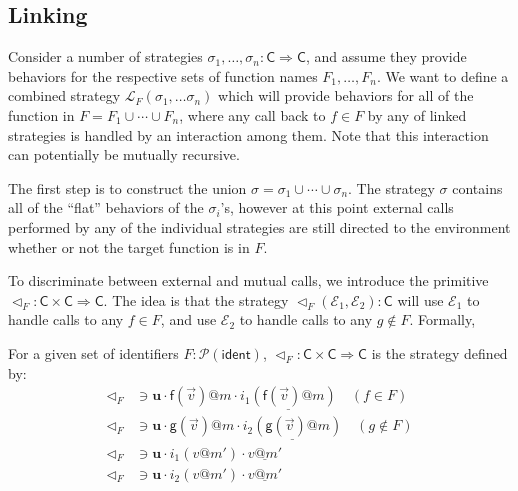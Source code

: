 \documentclass[acmsmall,anonymous]{acmart}
\makeatletter
\newcommand{\kw}[1]{\ensuremath{ \textsf{#1} }}
\newcommand{\EC}{\kw{C}}
\newcommand{\mcall}[3]{\kw{#1}({#2})@{#3}}
\newcommand{\pcall}[3]{%
  \underline{\mcall{#1}{#2}{#3}}%
}
\newcommand{\mret}[2]{{#1}@{#2}}
\newcommand{\pret}[2]{%
  \underline{\mret{#1}{#2}}%
}
\newcommand{\pshift}{1.6ex}
\newcommand{\pcdist}{2.5}
\newcommand{\pcangle}{60}
\newcommand{\ph}[1]{%
  \tikz[remember picture]{\coordinate (#1);}}
\newcommand{\pt}[1]{%
  \tikz[remember picture, overlay]{
    \draw[->]
      let \p{dest} = (#1),
          \n1 = {ln(veclen(\x{dest}, \y{dest}) + 1)},
          \p1 = ($(0,0)+(0,\pshift)$),
          \p4 = ($(#1)+(0,\pshift)$),
          \p2 = ($(\p1)!\n1*\pcdist!-\pcangle:(\p4)$),
          \p3 = ($(\p4)!\n1*\pcdist!+\pcangle:(\p1)$) in
        (\p1) .. controls (\p2) and (\p3) .. (\p4);}}
\makeatother
\begin{document}


\subsection{Linking} %

Consider a number of strategies
$\sigma_1, \ldots, \sigma_n : \EC \Rightarrow \EC$,
and assume they provide behaviors
for the respective sets of function names $F_1, \ldots, F_n$.
We want to define
a combined strategy $\mathcal{L}_F(\sigma_1, \ldots \sigma_n)$
which will provide behaviors for
all of the function in $F = F_1 \cup \cdots \cup F_n$,
where any call back to $f \in F$ by any of linked strategies
is handled by an interaction among them.
Note that this interaction
can potentially be mutually recursive.

The first step is to construct the union
$\sigma = \sigma_1 \cup \cdots \cup \sigma_n$.
The strategy $\sigma$
contains all of the ``flat'' behaviors of the $\sigma_i$'s,
however at this point
external calls performed by any of the individual strategies
are still directed to the environment
whether or not the target function is in $F$.

To discriminate between external and mutual calls,
we introduce the primitive $\lhd_F : \EC \times \EC \Rightarrow \EC$.
The idea is that the strategy $\lhd_F(\mathcal{E}_1, \mathcal{E}_2) : \EC$
will use $\mathcal{E}_1$ to handle calls to any $f \in F$,
and use $\mathcal{E}_2$ to handle calls to any $g \notin F$.
Formally,
\begin{definition}[$\lhd_F$]
For a given set of identifiers $F : \mathcal{P}(\kw{ident})$,
$\lhd_F : \EC \times \EC \Rightarrow \EC$ is the strategy defined by:
\begin{align*}
  \lhd_F &\ni
    \mathbf{u} \cdot
    \mcall{f}{\vec{v}}{m} \cdot
    \underline{i_1(\mcall{f}{\vec{v}}{m})}
    \quad (f \in F) \\
  \lhd_F &\ni
    \mathbf{u} \cdot
    \mcall{g}{\vec{v}}{m} \cdot
    \underline{i_2(\mcall{g}{\vec{v}}{m})}
    \quad (g \notin F) \\
  \lhd_F &\ni
    \mathbf{u} \cdot
    i_1(\mret{v}{m'}) \cdot
    \pret{v}{m'} \\
  \lhd_F &\ni
    \mathbf{u} \cdot
    i_2(\mret{v}{m'}) \cdot
    \pret{v}{m'}
\end{align*}
\end{definition}
\end{document}
